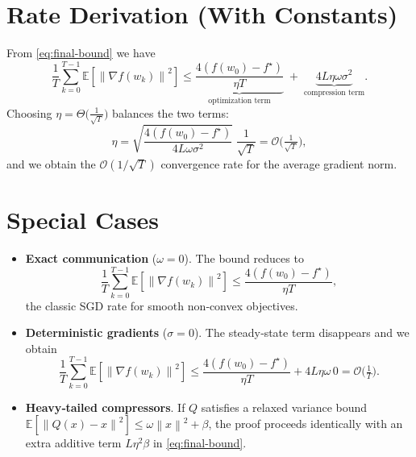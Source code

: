 \documentclass{article}
\newcommand{\E}{\mathbb{E}}
\newcommand{\norm}[1]{\left\lVert#1\right\rVert}
\begin{document}
\section*{Rate Derivation (With Constants)}
From \eqref{eq:final-bound} we have
\[
\frac{1}{T}\sum_{k=0}^{T-1}\E[\norm{\nabla f(w_k)}^2]
\le \underbrace{\frac{4(f(w_0)-f^\star)}{\eta T}}_{\text{optimization term}}
\;+\;
\underbrace{4L\eta\omega\sigma^2}_{\text{compression term}} .
\]
Choosing $\eta = \Theta\!\big(\frac{1}{\sqrt{T}}\big)$ balances the two terms:
\[
\eta = \sqrt{\frac{4(f(w_0)-f^\star)}{4L\omega\sigma^2}}\; \frac{1}{\sqrt{T}}
= \mathcal{O}\!\big(\tfrac{1}{\sqrt{T}}\big),
\]
and we obtain the $\mathcal{O}(1/\sqrt{T})$ convergence rate for the average gradient norm.

\section*{Special Cases}
\begin{itemize}
\item \textbf{Exact communication} ($\omega=0$). The bound reduces to
\[
\frac{1}{T}\sum_{k=0}^{T-1}\E[\norm{\nabla f(w_k)}^2]\le
\frac{4(f(w_0)-f^\star)}{\eta T},
\]
the classic SGD rate for smooth non‑convex objectives.
\item \textbf{Deterministic gradients} ($\sigma=0$). The steady‑state term disappears and we obtain
\[
\frac{1}{T}\sum_{k=0}^{T-1}\E[\norm{\nabla f(w_k)}^2]\le
\frac{4(f(w_0)-f^\star)}{\eta T}+4L\eta\omega\,0
= \mathcal{O}\!\big(\tfrac{1}{T}\big).
\]
\item \textbf{Heavy‑tailed compressors}. If $Q$ satisfies a relaxed variance bound
$\E[\norm{Q(x)-x}^2]\le \omega\norm{x}^2+\beta$, the proof proceeds identically with an extra additive term $L\eta^2\beta$ in \eqref{eq:final-bound}.
\end{itemize}
\end{document}
